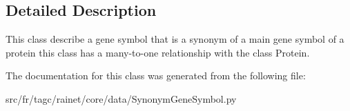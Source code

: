 \subsection{Detailed Description}
This class describe a gene symbol that is a synonym of a main gene symbol of a protein this class has a many-\/to-\/one relationship with the class Protein. 

The documentation for this class was generated from the following file\+:\begin{DoxyCompactItemize}
\item 
src/fr/tagc/rainet/core/data/Synonym\+Gene\+Symbol.\+py\end{DoxyCompactItemize}
